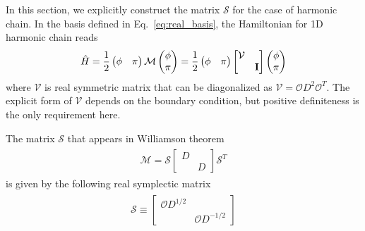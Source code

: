 In this section, we explicitly construct the matrix $\mathcal{S}$ for the case of harmonic chain. In the basis defined in Eq.~\eqref{eq:real_basis}, the Hamiltonian for 1D harmonic chain reads
\begin{eqnarray}\begin{aligned}
\hat{H}
=\frac{1}{2}
\begin{pmatrix}
\phi & \pi
\end{pmatrix}
\mathcal{M}
\begin{pmatrix}
\phi\\
\pi
\end{pmatrix}
=\frac{1}{2}
\begin{pmatrix}
\phi & \pi
\end{pmatrix}
\begin{bmatrix}
\mathcal{V} \\
& {\bf I}
\end{bmatrix}
\begin{pmatrix}
\phi\\
\pi
\end{pmatrix}
\end{aligned}\end{eqnarray}
where $\mathcal{V}$ is real symmetric matrix that can be diagonalized as $\mathcal{V}=\mathcal{O}D^2\mathcal{O}^T$. The explicit form of $\mathcal{V}$ depends on the boundary condition, but positive definiteness is the only requirement here. 

The matrix $\mathcal{S}$ that appears in Williamson theorem
\begin{eqnarray}
\begin{aligned}
\mathcal{M}=\mathcal{S}
\begin{bmatrix}
D \\ 
& D
\end{bmatrix}
\mathcal{S}^T
\end{aligned}
\end{eqnarray}
is given by the following real symplectic matrix
\begin{eqnarray}\begin{aligned}
\mathcal{S}\equiv
\begin{bmatrix}
\mathcal{O}D^{1/2} \\
& \mathcal{O}D^{-1/2}
\end{bmatrix}
\end{aligned}\end{eqnarray}


